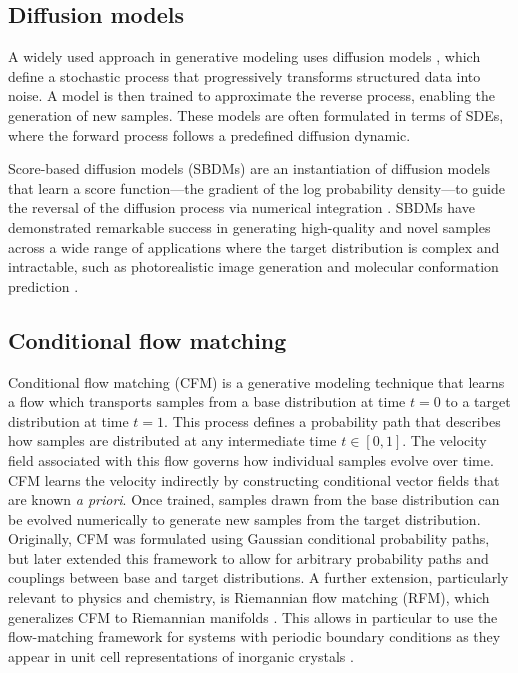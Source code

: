 \subsection{Diffusion models}

A widely used approach in generative modeling uses diffusion models \citep{sohl-dickstein_deep_2015}, which define a stochastic process that progressively transforms structured data into
noise. A model is then trained to approximate the reverse
process, enabling the generation of new samples. These
models are often formulated in terms of SDEs, where the
forward process follows a predefined diffusion dynamic.

Score-based diffusion models (SBDMs) are an instantiation of diffusion models that learn a score function---the gradient of the log probability density---to guide the reversal of the diffusion process via numerical integration \citep{song_scorebased_2021}. 
SBDMs have demonstrated remarkable success in generating high-quality and novel samples across a wide range of applications where the target distribution is complex and intractable, such as photorealistic image generation \citep{saharia_photorealistic_2022} and molecular conformation prediction \citep{corso_diffdock_2023}.

\subsection{Conditional flow matching}
Conditional flow matching (CFM) \citep{lipman_flow_2023} is a generative modeling technique that learns a flow which transports samples from a base distribution at time $t=0$ to a target distribution at time $t=1$. This process defines a probability path that describes how samples are distributed at any intermediate time $t \in [0, 1]$.
The velocity field associated with this flow governs how individual samples evolve over time. 
CFM learns the velocity indirectly by constructing conditional vector fields that are known \textit{a priori}. Once trained, samples drawn from the base distribution can be evolved numerically to generate new samples from the target distribution.
Originally, CFM was formulated using Gaussian conditional probability paths, but \citet{tong_improving_2024} later extended this framework to allow for arbitrary probability paths and couplings between base and target distributions. 
A further extension, particularly relevant to physics and chemistry, is Riemannian flow matching (RFM), which generalizes CFM to Riemannian manifolds \citep{chen_flow_2024}. This allows in particular to use the flow-matching framework for systems with periodic boundary conditions as they appear in unit cell representations of inorganic crystals \citep{miller_flowmm_2024}.





